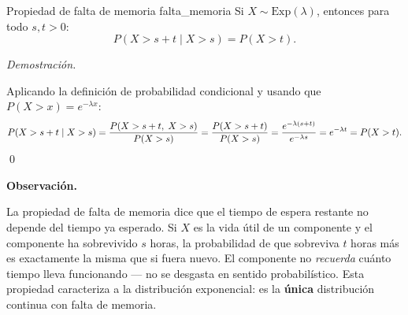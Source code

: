 \documentclass[12pt, a4paper]{book}
\newenvironment{observacion}{%
    \par\medskip\noindent\textbf{\color{azul}Observaci\'{o}n.}\enspace\itshape
}{\par\medskip}
\renewenvironment{proof}{%
    \par\medskip\noindent\textit{Demostraci\'{o}n.}\enspace
}{\qed\par\medskip}
\numberwithin{equation}{chapter}
\begin{document}
\begin{proposicion}{Propiedad de falta de memoria}
	{falta_memoria}
	Si $X \sim \mathrm{Exp}(\lambda)$, entonces para todo
	$s, t > 0$:
	\[
	P(X > s + t \mid X > s) = P(X > t).
	\]
\end{proposicion}

\begin{proof}
	Aplicando la definición de probabilidad condicional y usando
	que $P(X > x) = e^{-\lambda x}$:
	\[
	P(X > s+t \mid X > s)
	= \frac{P(X > s+t,\; X > s)}{P(X > s)}
	= \frac{P(X > s+t)}{P(X > s)}
	= \frac{e^{-\lambda(s+t)}}{e^{-\lambda s}}
	= e^{-\lambda t}
	= P(X > t). \qedhere
	\]
\end{proof}

\begin{observacion}
	La propiedad de falta de memoria dice que el tiempo de espera
	restante no depende del tiempo ya esperado. Si $X$ es la vida
	útil de un componente y el componente ha sobrevivido $s$ horas,
	la probabilidad de que sobreviva $t$ horas más es exactamente
	la misma que si fuera nuevo. El componente no \emph{recuerda}
	cuánto tiempo lleva funcionando --- no se desgasta en sentido
	probabilístico. Esta propiedad caracteriza a la distribución
	exponencial: es la \textbf{única} distribución continua con
	falta de memoria.
\end{observacion}
\end{document}

